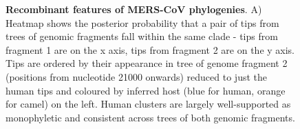 \documentclass[11pt,oneside,letterpaper]{article}
\begin{document}
%
\begin{figure}%
    \centering
    \qquad
    \caption{\textbf{Recombinant features of MERS-CoV phylogenies}.
    A) Heatmap shows the posterior probability that a pair of tips from trees of genomic fragments fall within the same clade - tips from fragment 1 are on the x axis, tips from fragment 2 are on the y axis.
    Tips are ordered by their appearance in tree of genome fragment 2 (positions from nucleotide 21000 onwards) reduced to just the human tips and coloured by inferred host (blue for human, orange for camel) on the left.
    Human clusters are largely well-supported as monophyletic and consistent across trees of both genomic fragments.
}
\end{figure}
\end{document}
